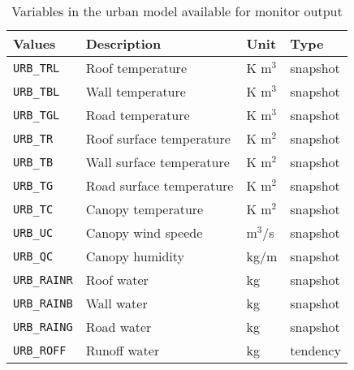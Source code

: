 \begin{table}[h]
\begin{center}
  \caption{Variables in the urban model available for monitor output}
  \label{tab:varlist_monitor_urban}
  \begin{tabularx}{150mm}{|l|X|l|l|} \hline
    \rowcolor[gray]{0.9}  Values & Description & Unit & Type \\ \hline
      \verb|URB_TRL|    & Roof temperature         & K m$^3$ & snapshot \\
      \verb|URB_TBL|    & Wall temperature         & K m$^3$ & snapshot \\
      \verb|URB_TGL|    & Road temperature         & K m$^3$ & snapshot \\
      \verb|URB_TR|     & Roof surface temperature & K m$^2$ & snapshot \\
      \verb|URB_TB|     & Wall surface temperature & K m$^2$ & snapshot \\
      \verb|URB_TG|     & Road surface temperature & K m$^2$ & snapshot \\
      \verb|URB_TC|     & Canopy temperature       & K m$^2$ & snapshot \\
      \verb|URB_UC|     & Canopy wind speede       & m$^3$/s & snapshot \\
      \verb|URB_QC|     & Canopy humidity          & kg/m & snapshot \\
      \verb|URB_RAINR|  & Roof water               & kg   & snapshot \\
      \verb|URB_RAINB|  & Wall water               & kg   & snapshot \\
      \verb|URB_RAING|  & Road water               & kg   & snapshot \\
      \verb|URB_ROFF|   & Runoff water             & kg   & tendency \\
    \hline
  \end{tabularx}
\end{center}
\end{table}

